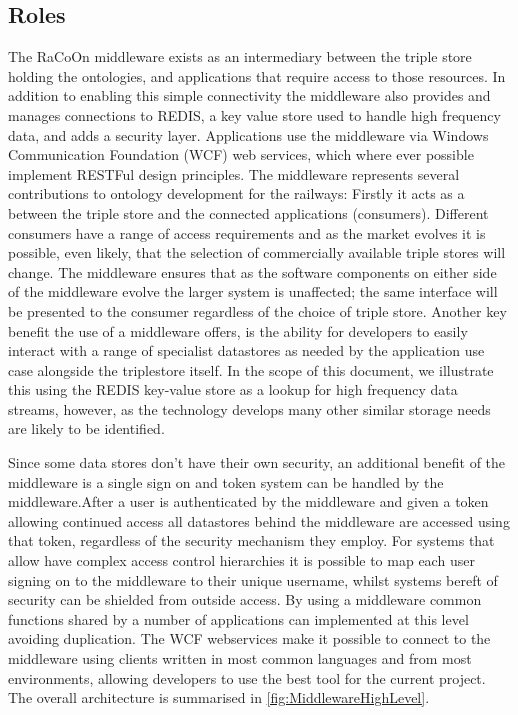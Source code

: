 \subsection{Roles}
The RaCoOn middleware exists as an intermediary between the triple store holding the ontologies, and applications that require access to those resources. In addition to enabling this simple connectivity the middleware also provides and manages connections to REDIS, a key value store used to handle high frequency data, and adds a security layer. Applications use the middleware via Windows Communication Foundation (WCF) web services, which where ever possible implement RESTFul design principles. The middleware represents several contributions to ontology development for the railways: Firstly it acts as a  between the triple store and the connected applications (consumers). Different consumers have a range of access requirements and as the market evolves it is possible, even likely, that the selection of commercially available triple stores will change. The middleware ensures that as the software components on either side of the middleware evolve the larger system is unaffected; the same interface will be presented to the consumer regardless of the choice of triple store. Another key benefit the use of a middleware offers, is the ability for developers to easily interact with a range of specialist datastores as needed by the application use case alongside the triplestore itself. In the scope of this document, we illustrate this using the REDIS key-value store as a lookup for high frequency data streams, however, as the technology develops many other similar storage needs are likely to be identified.

Since some data stores don't have their own security, an additional benefit of the middleware is a single sign on and token system can be handled by the middleware.After a user is authenticated by the middleware and given a token allowing continued access all datastores behind the middleware are accessed using that token, regardless of the security mechanism they employ. For systems that allow have complex access control hierarchies it is possible to map each user signing on to the middleware to their unique username, whilst systems bereft of security can be shielded from outside access. By using a middleware common functions shared by a number of applications can implemented at this level avoiding duplication. The WCF webservices make it possible to connect to the middleware using clients written in most common languages and from most environments, allowing developers to use the best tool for the current project. The overall architecture is summarised in \autoref{fig:MiddlewareHighLevel}.

